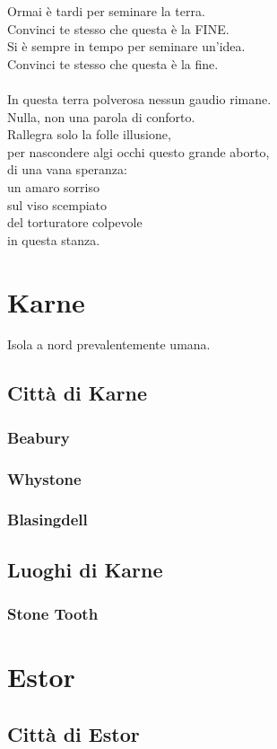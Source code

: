 \documentclass[10pt,twoside,twocolumn]{article}
\begin{document}
{  Ormai è tardi per seminare la terra.\\
  Convinci te stesso che questa è la FINE.\\
  Si è sempre in tempo per seminare un'idea.\\
  Convinci te stesso che questa è la fine.\\
  \\
  In questa terra polverosa nessun gaudio rimane.\\
  Nulla, non una parola di conforto.\\
  Rallegra solo la folle illusione,\\
  per nascondere algi occhi questo grande aborto,\\
  di una vana speranza:\\
  un amaro sorriso\\
  sul viso scempiato\\
  del torturatore colpevole\\
  in questa stanza.\\
}
\section{Karne}
Isola a nord prevalentemente umana.
\subsection{Citt\`a di Karne}
\subsubsection{Beabury}
\subsubsection{Whystone}
\subsubsection{Blasingdell}
\subsection{Luoghi di Karne}
\subsubsection{Stone Tooth}
\section{Estor}
\subsection{Citt\`a di Estor}
\end{document}

